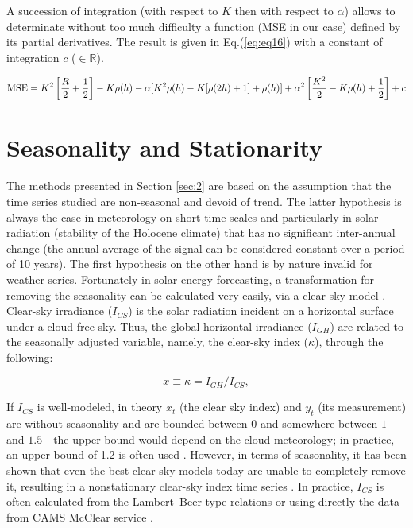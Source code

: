 \documentclass[preprint,12pt,3p]{elsarticle}
\begin{document}
A succession of integration (with respect to $K$ then with respect to $\alpha$) allows to determinate without too much difficulty a function (MSE in our case) defined by its partial derivatives. The result is given in Eq.(\ref{eq:eq16}) with a constant of integration $c$ ($\in \mathbb{R}$).

\begin{equation}
\label{eq:eq16}
\textnormal{\textnormal{MSE}}=K^2\left[\frac{R}{2}+\frac{1}{2}\right]-K\rho(h)-\alpha[K^2\rho(h)-K[\rho(2h)+1]+\rho(h)]+\alpha^2\left[\frac{K^2}{2}-K\rho(h)+\frac{1}{2}\right]+c
\end{equation}
 
 \section{Seasonality and Stationarity}
\label{sec:season}
The methods presented in Section \ref{sec:2} are based on the assumption that the time series studied are non-seasonal and devoid of trend. The latter hypothesis is always the case in meteorology on short time scales and particularly in solar radiation (stability of the Holocene climate) that has no significant inter-annual change (the annual average of the signal can be considered constant over a period of 10 years). The first hypothesis on the other hand is by nature invalid for weather series. Fortunately in solar energy forecasting, a transformation for removing the seasonality can be calculated very easily, via a clear-sky model \citep{SUN2021110087}. Clear-sky irradiance ($I_{CS}$) is the solar radiation incident on a horizontal surface under a cloud-free sky. Thus, the global horizontal irradiance ($I_{GH}$) are related to the seasonally adjusted variable, namely, the clear-sky index ($\kappa$), through the following:


\begin{equation}
\label{eq:S1}
    x\equiv \kappa =I_{GH}/I_{CS},
\end{equation}

If $I_{CS}$ is well-modeled, in theory $x_t$ (the clear sky index) and $y_t$ (its measurement) are without seasonality and are bounded between $ 0 $ and somewhere between $ 1 $ and $1.5$---the upper bound would depend on the cloud meteorology; in practice, an upper bound of 1.2 is often used \citep{doi:10.1063/1.5094494}. However, in terms of seasonality, it has been shown that even the best clear-sky models today are unable to completely remove it, resulting in a nonstationary clear-sky index time series \citep{doi:10.1063/5.0003495}. In practice, $I_{CS}$ is often calculated from the Lambert--Beer type relations \citep{ineichen_broadband_2008} or using directly the data from CAMS McClear service \citep{Lefevre2013}. 
\end{document}
